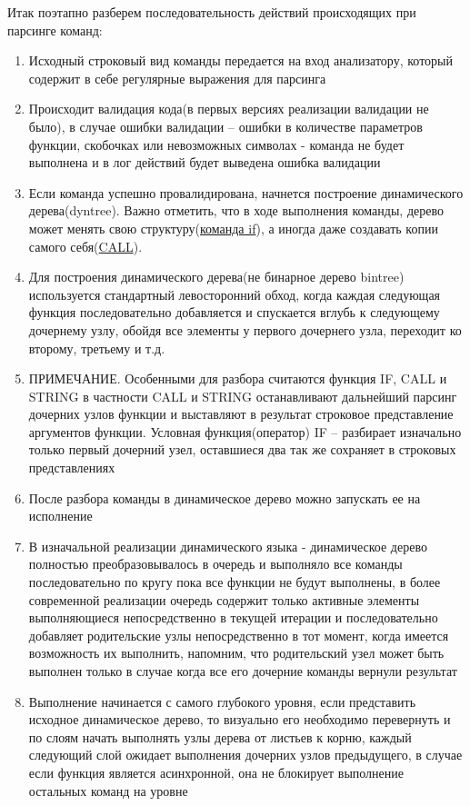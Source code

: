 \documentclass[../index.tex]{subfiles}
\begin{document}
Итак поэтапно разберем последовательность действий происходящих при парсинге команд:
\begin{enumerate}
    \item Исходный строковый вид команды передается на вход анализатору, который содержит в себе регулярные выражения для парсинга
    \item Происходит валидация кода(в первых версиях реализации валидации не было), в случае ошибки валидации -- ошибки в количестве параметров функции, скобочках или невозможных символах - команда не будет выполнена и в лог действий будет выведена ошибка валидации
    \item Если команда успешно провалидирована, начнется построение динамического дерева(\gls{dyntree}). Важно отметить, что в ходе выполнения команды, дерево может менять свою структуру(\hyperref[sec:fif]{команда if}), а иногда даже создавать копии самого себя(\hyperref[sec:fcall]{CALL}). 
    \item Для построения динамического дерева(не бинарное дерево \gls{bintree}) используется стандартный левосторонний обход, когда каждая следующая функция последовательно добавляется и спускается вглубь к следующему дочернему узлу, обойдя все элементы у первого дочернего узла, переходит ко второму, третьему и т.д.
    \item ПРИМЕЧАНИЕ. Особенными для разбора считаются функция IF, CALL и STRING в частности CALL и STRING останавливают дальнейший парсинг дочерних узлов функции и выставляют в результат строковое представление аргументов функции. Условная функция(оператор) IF -- разбирает изначально только первый дочерний узел, оставшиеся два так же сохраняет в строковых представлениях
    \item После разбора команды в динамическое дерево можно запускать ее на исполнение 
    \item В изначальной реализации динамического языка - динамическое дерево полностью преобразовывалось в очередь и выполняло все команды последовательно по кругу пока все функции не будут выполнены, в более современной реализации очередь содержит только активные элементы выполняющиеся непосредственно в текущей итерации и последовательно добавляет родительские узлы непосредственно в тот момент, когда имеется возможность их выполнить, напомним, что родительский узел может быть выполнен только в случае когда все его дочерние команды вернули результат
    \item Выполнение начинается с самого глубокого уровня, если представить исходное динамическое дерево, то визуально его необходимо перевернуть и по слоям начать выполнять узлы дерева от листьев к корню, каждый следующий слой ожидает выполнения дочерних узлов предыдущего, в случае если функция является асинхронной, она не блокирует выполнение остальных команд на уровне

\end{enumerate}
\end{document}
